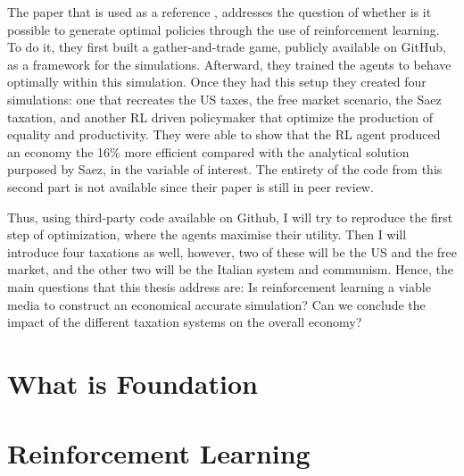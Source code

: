 \documentclass[12pt,a4paper,openright]{report}
\numberwithin{equation}{section}
\begin{document}
The paper that is used as a reference \cite{zheng2021ai}, addresses the question of whether is it possible to generate optimal policies through the use of reinforcement learning. To do it, they first built a gather-and-trade game, publicly available on GitHub, as a framework for the simulations. Afterward, they trained the agents to behave optimally within this simulation. Once they had this setup they created four simulations: one that recreates the US taxes, the free market scenario, the Saez taxation, and another RL driven policymaker that optimize the production of equality and productivity. They were able to show that the RL agent produced an economy the 16\% more efficient compared with the analytical solution purposed by Saez\cite{saez2001using}, in the variable of interest. The entirety of the code from this second part is not available since their paper is still in peer review.

Thus, using third-party code available on Github, I will try to reproduce the first step of optimization, where the agents maximise their utility. Then I will introduce four taxations as well, however, two of these will be the US and the free market, and the other two will be the Italian system and communism. Hence, the main questions that this thesis address are: Is reinforcement learning a viable media to construct an economical accurate simulation? Can we conclude the impact of the different taxation systems on the overall economy?

\chapter{What is Foundation}




\chapter{Reinforcement Learning}
 
\end{document}
